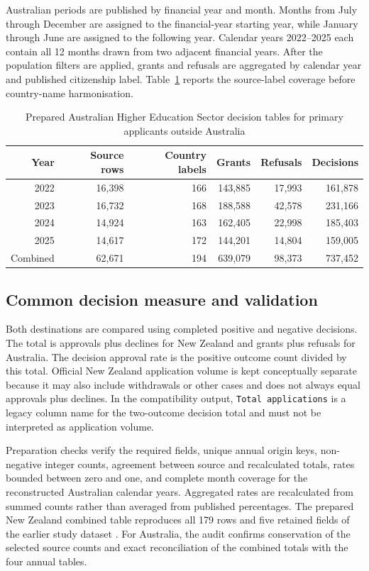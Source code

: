 \documentclass[runningheads]{llncs}
\begin{document}
Australian periods are published by financial year and month. Months from July through December are assigned to the financial-year starting year, while January through June are assigned to the following year. Calendar years 2022--2025 each contain all 12 months drawn from two adjacent financial years. After the population filters are applied, grants and refusals are aggregated by calendar year and published citizenship label. Table~\ref{tab:au-prepared-tables} reports the source-label coverage before country-name harmonisation.

\begin{table}
\caption{Prepared Australian Higher Education Sector decision tables for primary applicants outside Australia}
\label{tab:au-prepared-tables}
\centering
\small
\begin{tabular}{|r|r|r|r|r|r|}
\hline
Year & Source rows & Country labels & Grants & Refusals & Decisions \\
\hline
2022 & 16,398 & 166 & 143,885 & 17,993 & 161,878 \\
2023 & 16,732 & 168 & 188,588 & 42,578 & 231,166 \\
2024 & 14,924 & 163 & 162,405 & 22,998 & 185,403 \\
2025 & 14,617 & 172 & 144,201 & 14,804 & 159,005 \\
\hline
Combined & 62,671 & 194 & 639,079 & 98,373 & 737,452 \\
\hline
\end{tabular}
\end{table}

\subsection{Common decision measure and validation}

Both destinations are compared using completed positive and negative decisions. The total is approvals plus declines for New Zealand and grants plus refusals for Australia. The decision approval rate is the positive outcome count divided by this total. Official New Zealand application volume is kept conceptually separate because it may also include withdrawals or other cases and does not always equal approvals plus declines. In the compatibility output, \texttt{Total applications} is a legacy column name for the two-outcome decision total and must not be interpreted as application volume.

Preparation checks verify the required fields, unique annual origin keys, non-negative integer counts, agreement between source and recalculated totals, rates bounded between zero and one, and complete month coverage for the reconstructed Australian calendar years. Aggregated rates are recalculated from summed counts rather than averaged from published percentages. The prepared New Zealand combined table reproduces all 179 rows and five retained fields of the earlier study dataset \cite{Kaplan2026NZVisaApproval}. For Australia, the audit confirms conservation of the selected source counts and exact reconciliation of the combined totals with the four annual tables.
\end{document}
